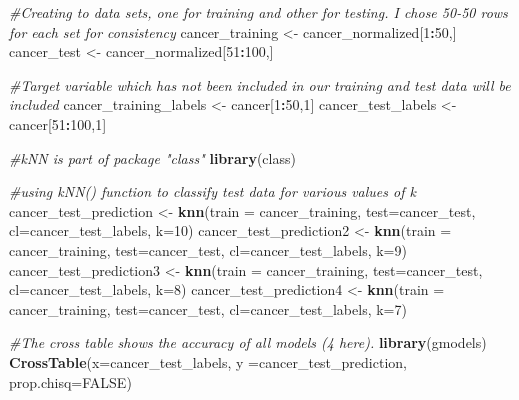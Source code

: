 \documentclass[]{article}
\newenvironment{Shaded}{\begin{snugshade}}{\end{snugshade}}
\newcommand{\KeywordTok}[1]{\textcolor[rgb]{0.13,0.29,0.53}{\textbf{#1}}}
\newcommand{\DataTypeTok}[1]{\textcolor[rgb]{0.13,0.29,0.53}{#1}}
\newcommand{\DecValTok}[1]{\textcolor[rgb]{0.00,0.00,0.81}{#1}}
\newcommand{\StringTok}[1]{\textcolor[rgb]{0.31,0.60,0.02}{#1}}
\newcommand{\CommentTok}[1]{\textcolor[rgb]{0.56,0.35,0.01}{\textit{#1}}}
\newcommand{\OtherTok}[1]{\textcolor[rgb]{0.56,0.35,0.01}{#1}}
\newcommand{\OperatorTok}[1]{\textcolor[rgb]{0.81,0.36,0.00}{\textbf{#1}}}
\newcommand{\NormalTok}[1]{#1}
\begin{document}
\begin{Shaded}
\begin{Highlighting}[]
\CommentTok{#Creating to data sets, one for training and other for testing. I chose 50-50 rows for each set for consistency}
\NormalTok{cancer_training <-}\StringTok{ }\NormalTok{cancer_normalized[}\DecValTok{1}\OperatorTok{:}\DecValTok{50}\NormalTok{,]}
\NormalTok{cancer_test <-}\StringTok{ }\NormalTok{cancer_normalized[}\DecValTok{51}\OperatorTok{:}\DecValTok{100}\NormalTok{,]}

\CommentTok{#Target variable which has not been included in our training and test data will be included}
\NormalTok{cancer_training_labels <-}\StringTok{ }\NormalTok{cancer[}\DecValTok{1}\OperatorTok{:}\DecValTok{50}\NormalTok{,}\DecValTok{1}\NormalTok{]}
\NormalTok{cancer_test_labels <-}\StringTok{ }\NormalTok{cancer[}\DecValTok{51}\OperatorTok{:}\DecValTok{100}\NormalTok{,}\DecValTok{1}\NormalTok{]}

\CommentTok{#kNN is part of package "class"}
\KeywordTok{library}\NormalTok{(class)}

\CommentTok{#using kNN() function to classify test data for various values of k}
\NormalTok{cancer_test_prediction <-}\StringTok{ }\KeywordTok{knn}\NormalTok{(}\DataTypeTok{train =}\NormalTok{ cancer_training, }\DataTypeTok{test=}\NormalTok{cancer_test, }\DataTypeTok{cl=}\NormalTok{cancer_test_labels, }\DataTypeTok{k=}\DecValTok{10}\NormalTok{)}
\NormalTok{cancer_test_prediction2 <-}\StringTok{ }\KeywordTok{knn}\NormalTok{(}\DataTypeTok{train =}\NormalTok{ cancer_training, }\DataTypeTok{test=}\NormalTok{cancer_test, }\DataTypeTok{cl=}\NormalTok{cancer_test_labels, }\DataTypeTok{k=}\DecValTok{9}\NormalTok{)}
\NormalTok{cancer_test_prediction3 <-}\StringTok{ }\KeywordTok{knn}\NormalTok{(}\DataTypeTok{train =}\NormalTok{ cancer_training, }\DataTypeTok{test=}\NormalTok{cancer_test, }\DataTypeTok{cl=}\NormalTok{cancer_test_labels, }\DataTypeTok{k=}\DecValTok{8}\NormalTok{)}
\NormalTok{cancer_test_prediction4 <-}\StringTok{ }\KeywordTok{knn}\NormalTok{(}\DataTypeTok{train =}\NormalTok{ cancer_training, }\DataTypeTok{test=}\NormalTok{cancer_test, }\DataTypeTok{cl=}\NormalTok{cancer_test_labels, }\DataTypeTok{k=}\DecValTok{7}\NormalTok{)}

\CommentTok{#The cross table shows the accuracy of all models (4 here).}
\KeywordTok{library}\NormalTok{(gmodels)}
\KeywordTok{CrossTable}\NormalTok{(}\DataTypeTok{x=}\NormalTok{cancer_test_labels, }\DataTypeTok{y =}\NormalTok{cancer_test_prediction, }\DataTypeTok{prop.chisq=}\OtherTok{FALSE}\NormalTok{)}
\end{Highlighting}
\end{Shaded}
\end{document}
